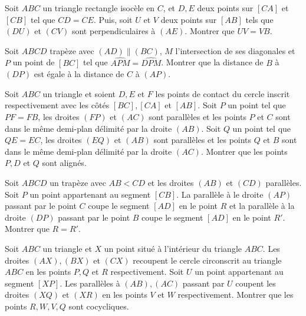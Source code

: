 \begin{exo}
Soit $ABC$ un triangle rectangle isocèle en $C$, et $D,E$ deux points sur $[CA]$ et $[CB]$ tel que $CD=CE$. Puis, soit $U$ et $V$ deux points sur $[AB]$ tels que $(DU)$ et $(CV)$ sont perpendiculaires à $(AE)$. Montrer que $UV=VB$.
\end{exo}

\begin{exo}

Soit $ABCD$ trapèze avec $(AD) \parallel (BC)$, $M$ l’intersection de ses diagonales et $P$ un point de $[BC]$ tel que $\widehat{APM}=\widehat{DPM}$. Montrer que la distance de $B$ à $(DP)$ est égale à la distance de $C$ à $(AP)$.
\end{exo}

\begin{exo}
Soit $ABC$ un triangle et soient $D,E$ et $F$ les points de contact du cercle inscrit respectivement avec les côtés $[BC], [CA]$ et $[AB]$. Soit $P$ un point tel que $PF=FB$, les droites $(FP)$ et $(AC)$ sont parallèles et les points $P$ et $C$ sont dans le même demi-plan délimité par la droite $(AB)$. Soit $Q$ un point tel que $QE=EC$, les droites $(EQ)$ et $(AB)$ sont parallèles et les points $Q$ et $B$ sont dans le même demi-plan délimité par la droite $(AC)$. Montrer que les points $P, D$ et $Q$ sont alignés. 
\end{exo}

\begin{exo}
Soit $ABCD$ un trapèze avec $AB<CD$ et les droites $(AB)$ et $(CD)$ parallèles. Soit $P$ un point appartenant au segment $[CB]$. La parallèle à le droite $(AP)$ passant par le point $C$ coupe le segment $[AD]$ en le point $R$ et la parallèle à la droite $(DP)$ passant par le point $B$ coupe le segment $[AD]$ en le point $R'$. Montrer que $R=R'$.
\end{exo}

\begin{exo}
Soit $ABC$ un triangle et $X$ un point situé à l'intérieur du triangle $ABC$. Les droites $(AX), (BX)$ et $(CX)$ recoupent le cercle circonscrit au triangle $ABC$ en les points $P,Q$ et $R$ respectivement. Soit $U$ un point appartenant au segment $[XP]$. Les parallèles à $(AB),(AC)$ passant par $U$ coupent les droites $(XQ)$ et $(XR)$ en les points $V$ et $W$ respectivement. Montrer que les points $R,W,V,Q$ sont cocycliques. 
\end{exo}

\newpage

